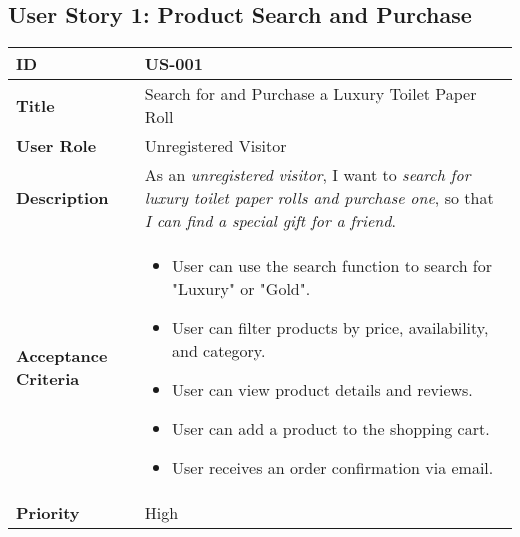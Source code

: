 \documentclass[a4paper,11pt]{article}
\begin{document}
\subsection{User Story 1: Product Search and Purchase}
\begin{tabularx}{\textwidth}{|l|X|}
\hline
\textbf{ID} & US-001 \\
\hline
\textbf{Title} & Search for and Purchase a Luxury Toilet Paper Roll \\
\hline
\textbf{User Role} & Unregistered Visitor \\
\hline
\textbf{Description} & As an \textit{unregistered visitor}, I want to \textit{search for luxury toilet paper rolls and purchase one}, so that \textit{I can find a special gift for a friend}. \\
\hline
\textbf{Acceptance Criteria} &
\begin{itemize}[noitemsep, topsep=0pt]
    \item User can use the search function to search for "Luxury" or "Gold".
    \item User can filter products by price, availability, and category.
    \item User can view product details and reviews.
    \item User can add a product to the shopping cart.
    \item User receives an order confirmation via email.
\end{itemize} \\
\hline
\textbf{Priority} & High \\
\hline
\end{tabularx}
\end{document}
